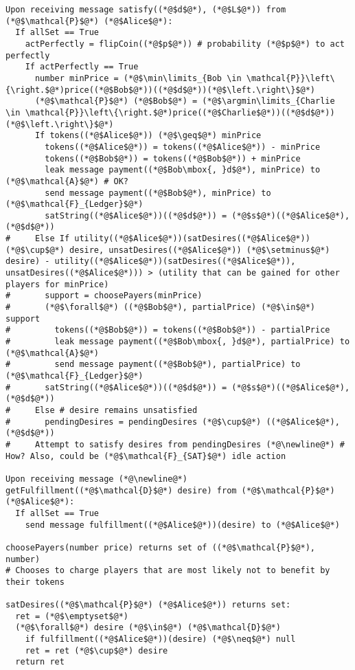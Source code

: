 \begin{lstlisting}[label=satfunc, style=numbers]
Upon receiving message satisfy((*@$d$@*), (*@$L$@*)) from (*@$\mathcal{P}$@*) (*@$Alice$@*):
  If allSet == True
    actPerfectly = flipCoin((*@$p$@*)) # probability (*@$p$@*) to act perfectly
    If actPerfectly == True
      number minPrice = (*@$\min\limits_{Bob \in \mathcal{P}}\left\{\right.$@*)price((*@$Bob$@*))((*@$d$@*))(*@$\left.\right\}$@*)
      (*@$\mathcal{P}$@*) (*@$Bob$@*) = (*@$\argmin\limits_{Charlie \in \mathcal{P}}\left\{\right.$@*)price((*@$Charlie$@*))((*@$d$@*))(*@$\left.\right\}$@*)
      If tokens((*@$Alice$@*)) (*@$\geq$@*) minPrice
        tokens((*@$Alice$@*)) = tokens((*@$Alice$@*)) - minPrice
        tokens((*@$Bob$@*)) = tokens((*@$Bob$@*)) + minPrice
        leak message payment((*@$Bob\mbox{, }d$@*), minPrice) to (*@$\mathcal{A}$@*) # OK?
        send message payment((*@$Bob$@*), minPrice) to (*@$\mathcal{F}_{Ledger}$@*)
        satString((*@$Alice$@*))((*@$d$@*)) = (*@$s$@*)((*@$Alice$@*), (*@$d$@*))
#     Else If utility((*@$Alice$@*))(satDesires((*@$Alice$@*)) (*@$\cup$@*) desire, unsatDesires((*@$Alice$@*)) (*@$\setminus$@*) desire) - utility((*@$Alice$@*))(satDesires((*@$Alice$@*)), unsatDesires((*@$Alice$@*))) > (utility that can be gained for other players for minPrice)
#       support = choosePayers(minPrice)
#       (*@$\forall$@*) ((*@$Bob$@*), partialPrice) (*@$\in$@*) support
#         tokens((*@$Bob$@*)) = tokens((*@$Bob$@*)) - partialPrice
#         leak message payment((*@$Bob\mbox{, }d$@*), partialPrice) to (*@$\mathcal{A}$@*)
#         send message payment((*@$Bob$@*), partialPrice) to (*@$\mathcal{F}_{Ledger}$@*)
#       satString((*@$Alice$@*))((*@$d$@*)) = (*@$s$@*)((*@$Alice$@*), (*@$d$@*))
#     Else # desire remains unsatisfied
#       pendingDesires = pendingDesires (*@$\cup$@*) ((*@$Alice$@*), (*@$d$@*))
#     Attempt to satisfy desires from pendingDesires (*@\newline@*) # How? Also, could be (*@$\mathcal{F}_{SAT}$@*) idle action

Upon receiving message (*@\newline@*) getFulfillment((*@$\mathcal{D}$@*) desire) from (*@$\mathcal{P}$@*) (*@$Alice$@*):
  If allSet == True
    send message fulfillment((*@$Alice$@*))(desire) to (*@$Alice$@*)

choosePayers(number price) returns set of ((*@$\mathcal{P}$@*), number)
# Chooses to charge players that are most likely not to benefit by their tokens

satDesires((*@$\mathcal{P}$@*) (*@$Alice$@*)) returns set:
  ret = (*@$\emptyset$@*)
  (*@$\forall$@*) desire (*@$\in$@*) (*@$\mathcal{D}$@*)
    if fulfillment((*@$Alice$@*))(desire) (*@$\neq$@*) null
    ret = ret (*@$\cup$@*) desire
  return ret


\end{lstlisting}
